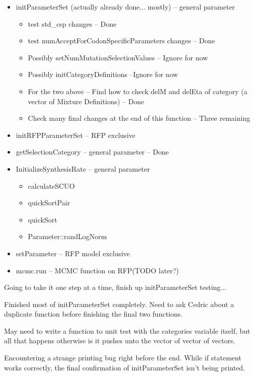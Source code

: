\documentclass[12pt,hyperref]{labbook}
\begin{document}
\begin{itemize}
    \item initParameterSet (actually already done... mostly) -- general parameter
    \begin{itemize}
        \item test std\_csp changes -- Done
        \item test numAcceptForCodonSpecificParameters changes -- Done
        \item Possibly setNumMutationSelectionValues -- Ignore for now
        \item Possibly initCategoryDefinitions --Ignore for now
        \item For the two above -- Find how to check delM and delEta of category (a vector of Mixture Definitions) -- Done
        \item Check many final changes at the end of this function -- Three remaining
    \end{itemize}
    \item initRFPParameterSet -- RFP exclusive
    \item getSelectionCategory -- general parameter -- Done
    \item InitializeSynthesisRate -- general parameter
    \begin{itemize}
        \item calculateSCUO
        \item quickSortPair
        \item quickSort
        \item Parameter::randLogNorm
    \end{itemize}
    \item setParameter -- RFP model exclusive
    \item mcmc.run -- MCMC function on RFP(TODO later?)
\end{itemize}


Going to take it one step at a time, finish up initParameterSet testing...

Finished most of initParameterSet completely. Need to ask Cedric about a duplicate function before
finishing the final two functions.

May need to write a function to unit test with the categories variable itself, but
all that happens otherwise is it pushes unto the vector of vector of vectors.

Encountering a strange printing bug right before the end. While if statement works correctly,
the final confirmation of initParameterSet isn't being printed.
\end{document}
